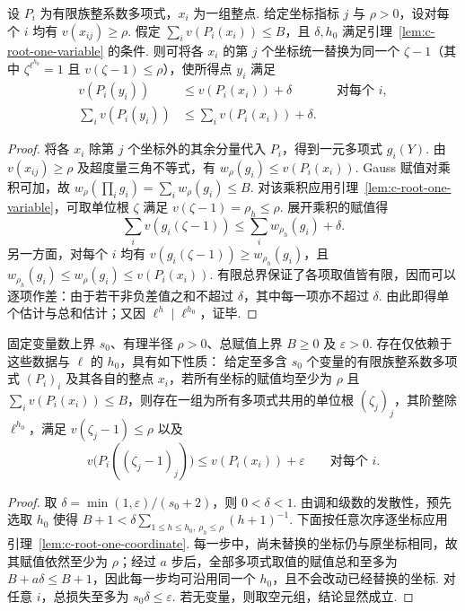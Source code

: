 \begin{lemma}[使有限族多项式共用单个坐标]
\label{lem:c-root-one-coordinate}
\emitthmsource
设 $P_i$ 为有限族整系数多项式，$x_i$ 为一组整点.
给定坐标指标 $j$ 与 $\rho>0$，设对每个 $i$ 均有 $v(x_{ij})\ge\rho$.
假定 $\sum_i v(P_i(x_i))\le B$，且 $\delta,h_0$ 满足引理~\ref{lem:c-root-one-variable} 的条件.
则可将各 $x_i$ 的第 $j$ 个坐标统一替换为同一个 $\zeta-1$（其中 $\zeta^{\ell^{h_0}}=1$ 且 $v(\zeta-1)\le\rho$），使所得点 $y_i$ 满足
\[
 \begin{aligned}
 v(P_i(y_i))&\le v(P_i(x_i))+\delta &&\text{对每个 }i,\\
 \sum_i v(P_i(y_i))&\le\sum_i v(P_i(x_i))+\delta.
 \end{aligned}
\]
\end{lemma}
\begin{proof}
将各 $x_i$ 除第 $j$ 个坐标外的其余分量代入 $P_i$，得到一元多项式 $g_i(Y)$.
由 $v(x_{ij})\ge\rho$ 及超度量三角不等式，有 $w_\rho(g_i)\le v(P_i(x_i))$.
Gauss 赋值对乘积可加，故 $w_\rho(\prod_i g_i)=\sum_i w_\rho(g_i)\le B$. 对该乘积应用引理~\ref{lem:c-root-one-variable}，可取单位根 $\zeta$ 满足 $v(\zeta-1)=\rho_h\le\rho$. 展开乘积的赋值得
\[
 \sum_i v(g_i(\zeta-1))\le\sum_i w_{\rho_h}(g_i)+\delta.
\]
另一方面，对每个 $i$ 均有 $v(g_i(\zeta-1))\ge w_{\rho_h}(g_i)$，且 $w_{\rho_h}(g_i)\le w_\rho(g_i)\le v(P_i(x_i))$.
有限总界保证了各项取值皆有限，因而可以逐项作差：由于若干非负差值之和不超过 $\delta$，其中每一项亦不超过 $\delta$.
由此即得单个估计与总和估计；又因 $\ell^h\mid\ell^{h_0}$，证毕.
\end{proof}

\begin{lemma}[有限族多项式的共同单位根特化]
\label{lem:c-root-simultaneous}
\emitthmsource
固定变量数上界 $s_0$、有理半径 $\rho>0$、总赋值上界 $B\ge0$ 及 $\varepsilon>0$.
存在仅依赖于这些数据与 $\ell$ 的 $h_0$，具有如下性质：
给定至多含 $s_0$ 个变量的有限族整系数多项式 $(P_i)_i$ 及其各自的整点 $x_i$，若所有坐标的赋值均至少为 $\rho$ 且 $\sum_i v(P_i(x_i))\le B$，则存在一组为所有多项式共用的单位根 $(\zeta_j)_j$，其阶整除 $\ell^{h_0}$，满足 $v(\zeta_j-1)\le\rho$ 以及
\[
 v\bigl(P_i((\zeta_j-1)_j)\bigr)\le v(P_i(x_i))+\varepsilon\qquad\text{对每个 }i .
\]
\end{lemma}
\begin{proof}
取 $\delta=\min(1,\varepsilon)/(s_0+2)$，则 $0<\delta<1$.
由调和级数的发散性，预先选取 $h_0$ 使得 $B+1<\delta\sum_{1\le h\le h_0,\,\rho_h\le\rho}(h+1)^{-1}$.
下面按任意次序逐坐标应用引理~\ref{lem:c-root-one-coordinate}.
每一步中，尚未替换的坐标仍与原坐标相同，故其赋值依然至少为 $\rho$；经过 $a$ 步后，全部多项式取值的赋值总和至多为 $B+a\delta\le B+1$，因此每一步均可沿用同一个 $h_0$，且不会改动已经替换的坐标.
对任意 $i$，总损失至多为 $s_0\delta\le\varepsilon$.
若无变量，则取空元组，结论显然成立.
\end{proof}


